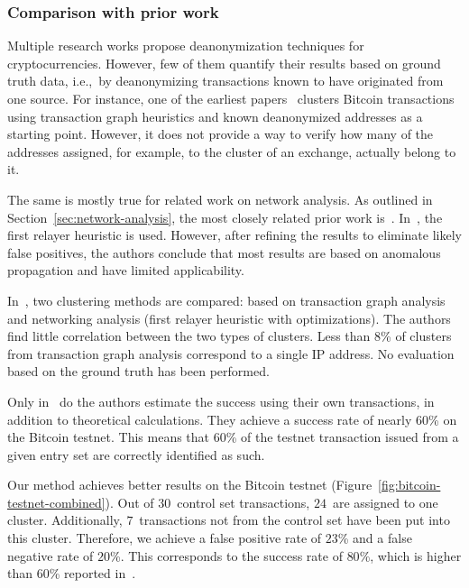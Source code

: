 \subsubsection*{Comparison with prior work}

Multiple research works propose deanonymization techniques for cryptocurrencies.
However, few of them quantify their results based on ground truth data, i.e.,~by deanonymizing transactions known to have originated from one source.
For instance, one of the earliest papers~\cite{Meiklejohn2013} clusters Bitcoin transactions using transaction graph heuristics and known deanonymized addresses as a starting point.
However, it does not provide a way to verify how many of the addresses assigned, for example, to the cluster of an exchange, actually belong to it.

The same is mostly true for related work on network analysis.
As outlined in Section~\ref{sec:network-analysis}, the most closely related prior work is~\cite{Koshy2014, Biryukov2014, Neudecker2017}.
In~\cite{Koshy2014}, the first relayer heuristic is used.
However, after refining the results to eliminate likely false positives, the authors conclude that most results are based on anomalous propagation and have limited applicability.

In~\cite{Neudecker2017}, two clustering methods are compared: based on transaction graph analysis and networking analysis (first relayer heuristic with optimizations).
The authors find little correlation between the two types of clusters.
Less than $8$\% of clusters from transaction graph analysis correspond to a single IP address.
No evaluation based on the ground truth has been performed.

Only in~\cite{Biryukov2014} do the authors estimate the success using their own transactions, in addition to theoretical calculations.
They achieve a success rate of nearly $60$\% on the Bitcoin testnet.
This means that $60$\% of the testnet transaction issued from a given entry set are correctly identified as such.

Our method achieves better results on the Bitcoin testnet (Figure~\ref{fig:bitcoin-testnet-combined}).
Out of $30$~control set transactions, $24$~are assigned to one cluster.
Additionally, $7$~transactions not from the control set have been put into this cluster.
Therefore, we achieve a false positive rate of $23$\% and a false negative rate of $20$\%.
This corresponds to the success rate of $80$\%, which is higher than $60$\% reported in~\cite{Biryukov2014}.



